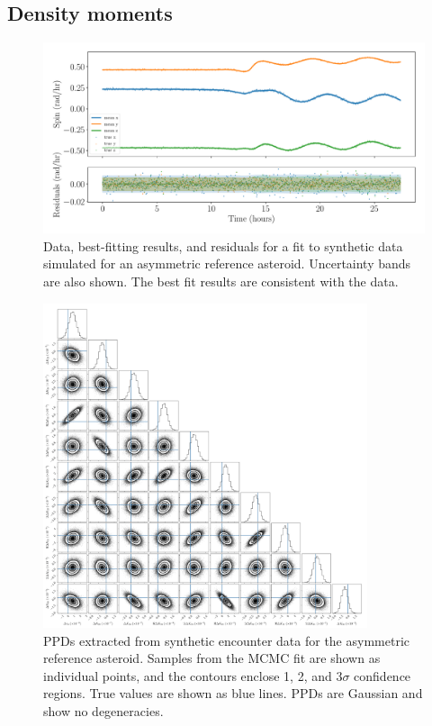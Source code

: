 \documentclass[fleqn,usenatbib]{mnras}
\begin{document}
\subsection{Density moments}
\label{sec:example-fit}
\begin{figure}
  \centering
  \includegraphics[width=\linewidth]{figs/example-residuals.pdf}
  \caption{Data, best-fitting results, and residuals for a fit to synthetic data simulated for an asymmetric reference asteroid. Uncertainty bands are also shown. The best fit results are consistent with the data.}
  \label{fig:example-residuals}
\end{figure}

\begin{figure}
  \centering
  \includegraphics[width=0.85\textwidth]{figs/example-corner.png}
  \caption{PPDs extracted from synthetic encounter data for the asymmetric reference asteroid. Samples from the MCMC fit are shown as individual points, and the contours enclose 1, 2, and 3$\sigma$ confidence regions. True values are shown as blue lines. PPDs are Gaussian and show no degeneracies.}
  \label{fig:example-corner}
\end{figure}
\end{document}
